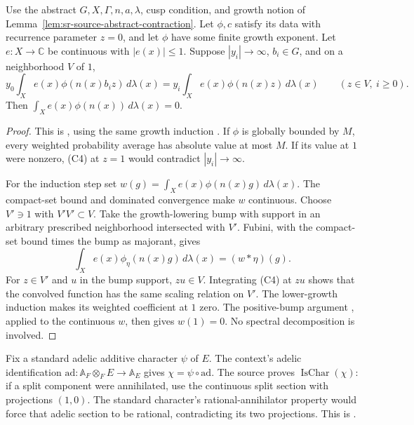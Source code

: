 \begin{srlemma}
\label{lem:sr-source-kill-coefficient}
Use the abstract \(G,X,\Gamma,n,a,\lambda\), cusp condition,
and growth notion of
Lemma~\ref{lem:sr-source-abstract-contraction}.
Let \(\phi,c\) satisfy its data with recurrence parameter \(z=0\),
and let \(\phi\) have some finite growth exponent.
Let \(e:X\to\mathbb C\) be continuous with \(|e(x)|\le1\).
Suppose \(|y_i|\to\infty\), \(b_i\in G\), and on a neighborhood
\(V\) of \(1\),
\[
 y_0\int_Xe(x)\phi(n(x)b_i z)\,d\lambda(x)
       =y_i\int_Xe(x)\phi(n(x)z)\,d\lambda(x)
                    \qquad(z\in V,\ i\ge0).
 \tag{C4}\label{eq:sr-source-weighted-coefficient-scaling}
\]
Then \(\int_Xe(x)\phi(n(x))\,d\lambda(x)=0\).
\end{srlemma}

\begin{proof}
This is , using the same
growth induction .
If \(\phi\) is globally bounded by \(M\), every weighted
probability average has absolute value at most \(M\).
If its value at \(1\) were nonzero, (C4) at \(z=1\)
would contradict \(|y_i|\to\infty\).

For the induction step set
\(w(g)=\int_Xe(x)\phi(n(x)g)\,d\lambda(x)\).
The compact-set bound  and dominated
convergence make \(w\) continuous.
Choose \(V'\ni1\) with \(V'V'\subset V\).
Take the growth-lowering bump with support in an arbitrary
prescribed neighborhood intersected with \(V'\).
Fubini, with the compact-set bound times the bump as
majorant, gives
\[
       \int_Xe(x)\phi_\eta(n(x)g)\,d\lambda(x)
                                  =(w*\eta)(g).
\]
For \(z\in V'\) and \(u\) in the bump support, \(zu\in V\).
Integrating (C4) at \(zu\) shows that the convolved
function has the same scaling relation on \(V'\).
The lower-growth induction makes its weighted coefficient
at \(1\) zero. The positive-bump argument
, applied to the continuous \(w\),
then gives \(w(1)=0\).
No spectral decomposition is involved.
\end{proof}

Fix a standard adelic additive character \(\psi\) of \(E\).
The context's adelic identification
\(\mathrm{ad}:\mathbb A_F\otimes_F E\to\mathbb A_E\)
gives \(\chi=\psi\circ\mathrm{ad}\).
The source proves \(\operatorname{IsChar}(\chi)\):
if a split component were annihilated, use the continuous
split section with projections \((1,0)\).
The standard character's rational-annihilator property would
force that adelic section to be rational, contradicting
its two projections. This is .

